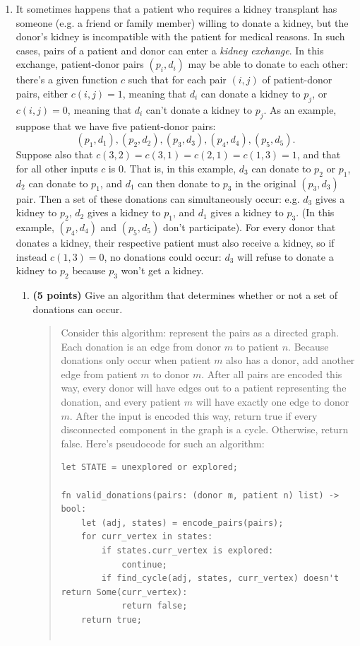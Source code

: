 \documentclass[11pt]{article}
\begin{document}
\begin{enumerate}
\item It sometimes happens that a patient who requires a kidney transplant has someone (e.g. a friend or family member) willing to donate a kidney, but the donor's kidney is incompatible with the patient for medical reasons. In such cases, pairs of a patient and donor can enter a \emph{kidney exchange}. In this exchange, patient-donor pairs $(p_i,d_i)$ may be able to donate to each other: there's a given function $c$ such that for each pair $(i,j)$ of patient-donor pairs, either $c(i,j) = 1$, meaning that $d_i$ can donate a kidney to $p_j$, or $c(i,j) = 0$, meaning that $d_i$ can't donate a kidney to $p_j$. As an example, suppose that we have five patient-donor pairs: $$(p_1,d_1), (p_2,d_2), (p_3,d_3), (p_4,d_4), (p_5,d_5).$$ Suppose also that $c(3,2) = c(3,1) = c(2,1) = c(1,3) = 1$, and that for all other inputs $c$ is 0. That is, in this example, $d_3$ can donate to $p_2$ or $p_1$, $d_2$ can donate to $p_1$, and $d_1$ can then donate to $p_3$ in the original $(p_3,d_3)$ pair. Then a set of these donations can simultaneously occur: e.g. $d_3$ gives a kidney to $p_2$, $d_2$ gives a kidney to $p_1$, and $d_1$ gives a kidney to $p_3$. (In this example, $(p_4,d_4)$ and $(p_5,d_5)$ don't participate). For every donor that donates a kidney, their respective patient must also receive a kidney, so if instead $c(1,3) = 0$, no donations could occur: $d_3$ will refuse to donate a kidney to $p_2$ because $p_3$ won't get a kidney.
\begin{enumerate}
    \item {\bf (5 points)} Give an algorithm that determines whether or not a set of donations can occur. 
      \begin{quote}
        \color{purple}
Consider this algorithm: represent the pairs as a directed graph. Each donation is an edge from donor $m$ to patient $n$. Because donations only occur when patient $m$ also has a donor, add another edge from patient $m$ to donor $m$. After all pairs are encoded this way, every donor will have edges out to a patient representing the donation, and every patient $m$ will have exactly one edge to donor $m$. After the input is encoded this way, return true if every disconnected component in the graph is a cycle. Otherwise, return false. Here's pseudocode for such an algorithm:

\newpage
  \begin{verbatim}
let STATE = unexplored or explored;

fn valid_donations(pairs: (donor m, patient n) list) -> bool:
    let (adj, states) = encode_pairs(pairs);
    for curr_vertex in states:
        if states.curr_vertex is explored:
            continue;
        if find_cycle(adj, states, curr_vertex) doesn't return Some(curr_vertex): 
            return false;
    return true;


\end{verbatim}
\end{quote}
\end{enumerate}
\end{enumerate}
\end{document}
